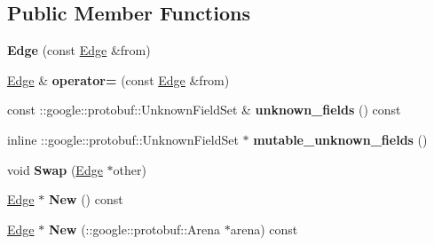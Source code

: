 \subsection*{Public Member Functions}
\begin{DoxyCompactItemize}
\item 
\hypertarget{classstruct_definitions_1_1_edge_abbfcfa6052720113b74122bad90bd331}{}\label{classstruct_definitions_1_1_edge_abbfcfa6052720113b74122bad90bd331} 
{\bfseries Edge} (const \hyperlink{classstruct_definitions_1_1_edge}{Edge} \&from)
\item 
\hypertarget{classstruct_definitions_1_1_edge_a94530fbe7c5011b202b489c35c963cfc}{}\label{classstruct_definitions_1_1_edge_a94530fbe7c5011b202b489c35c963cfc} 
\hyperlink{classstruct_definitions_1_1_edge}{Edge} \& {\bfseries operator=} (const \hyperlink{classstruct_definitions_1_1_edge}{Edge} \&from)
\item 
\hypertarget{classstruct_definitions_1_1_edge_ab872dec83dacf8d55c972c0653ef0ec7}{}\label{classstruct_definitions_1_1_edge_ab872dec83dacf8d55c972c0653ef0ec7} 
const \+::google\+::protobuf\+::\+Unknown\+Field\+Set \& {\bfseries unknown\+\_\+fields} () const
\item 
\hypertarget{classstruct_definitions_1_1_edge_ac9cabdbd5dd80128f940f985495ad3fa}{}\label{classstruct_definitions_1_1_edge_ac9cabdbd5dd80128f940f985495ad3fa} 
inline \+::google\+::protobuf\+::\+Unknown\+Field\+Set $\ast$ {\bfseries mutable\+\_\+unknown\+\_\+fields} ()
\item 
\hypertarget{classstruct_definitions_1_1_edge_a6e9ffdf04466ec6b3a1f6f240de9f275}{}\label{classstruct_definitions_1_1_edge_a6e9ffdf04466ec6b3a1f6f240de9f275} 
void {\bfseries Swap} (\hyperlink{classstruct_definitions_1_1_edge}{Edge} $\ast$other)
\item 
\hypertarget{classstruct_definitions_1_1_edge_a9bd054218e92e4a2d07a2f8e6fc07a34}{}\label{classstruct_definitions_1_1_edge_a9bd054218e92e4a2d07a2f8e6fc07a34} 
\hyperlink{classstruct_definitions_1_1_edge}{Edge} $\ast$ {\bfseries New} () const
\item 
\hypertarget{classstruct_definitions_1_1_edge_a08eeb78e1841c05759bc1258602fdfae}{}\label{classstruct_definitions_1_1_edge_a08eeb78e1841c05759bc1258602fdfae} 
\hyperlink{classstruct_definitions_1_1_edge}{Edge} $\ast$ {\bfseries New} (\+::google\+::protobuf\+::\+Arena $\ast$arena) const
\item 
\hypertarget{classstruct_definitions_1_1_edge_a27168ee1709122ee8d6dc8b2f5e81ad2}{}\label{classstruct_definitions_1_1_edge_a27168ee1709122ee8d6dc8b2f5e81ad2} 

\end{DoxyCompactItemize}

